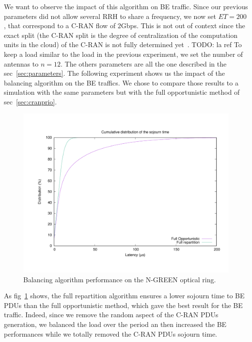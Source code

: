 \documentclass[]{algotel}
\newcommand{\todo}[1]{{\color{red} TODO: {#1}}}
\begin{document}
  We want to observe the impact of this algorithm on BE traffic. Since our previous parameters did not allow several RRH to share a frequency, we now set $ET = 200$, that correspond to a C-RAN flow of $2$Gbps. This is not out of context since the exact split (the C-RAN split is the degree of centralization of the computation units in the cloud) of the C-RAN is not fully determined yet~\cite{REF}.\todo {la ref} To keep a load similar to the load in the previous experiment, we set the number of antennas to $n=12$. The others parameters are all the one described in the sec~\ref{sec:parameters}.
  The following experiment shows us the impact of the balancing algorithm on the BE traffics. We chose to compare those results to a simulation with the same parameters but with the full opportunistic method of sec~\ref{sec:cranprio}.
  
   \begin{figure}[h]
\centering
      \includegraphics[scale=0.4]{optim.pdf}
     \caption{Balancing algorithm performance on the N-GREEN optical ring.}   \label{fig:optimres}
  \end{figure}
  
  As fig~\ref{fig:optimres} shows, the full repartition algorithm ensures a lower sojourn time to BE PDUs than the full opportunistic method, which gave the best result for the BE traffic. Indeed, since we remove the random aspect of the C-RAN PDUs generation, we balanced the load over the period an then increased the BE performances while we totally removed the C-RAN PDUs sojourn time.
  
  

\end{document}
